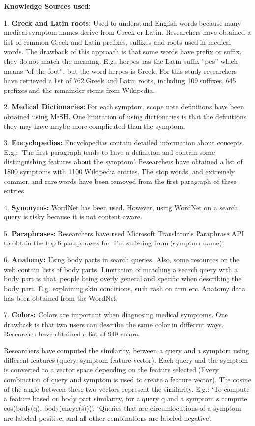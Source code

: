 \documentclass[]{article}
\begin{document}
\textbf{Knowledge Sources used:  }
 
1.\textbf{	Greek and Latin roots:} Used to understand English words because many medical symptom names derive from Greek or Latin. Researchers have obtained a list of common Greek and Latin prefixes, suffixes and roots used in medical words. The drawback of this approach is that some words have prefix or suffix, they do not match the meaning. E.g.: herpes has the Latin suffix “pes” which means “of the foot”, but the word herpes is Greek. For this study researchers have retrieved a list of 762 Greek and Latin roots, including 109 suffixes, 645 prefixes and the remainder stems from Wikipedia.
 
2.	\textbf{Medical Dictionaries:} For each symptom, scope note definitions have been obtained using MeSH. One limitation of using dictionaries is that the definitions they may have maybe more complicated than the symptom.

3.	\textbf{Encyclopedias:} Encyclopedias contain detailed information about concepts. E.g.: ‘The first paragraph tends to have a definition and contain some distinguishing features about the symptom’. Researchers have obtained a list of 1800 symptoms with 1100 Wikipedia entries. The stop words, and extremely common and rare words have been removed from the first paragraph of these entries

4.	\textbf{Synonyms:} WordNet has been used. However, using WordNet on a search query is risky because it is not content aware.

5.	\textbf{Paraphrases:} Researchers have used Microsoft Translator’s Paraphrase API to obtain the top 6 paraphrases for ‘I’m suffering from (symptom name)’.

6.	\textbf{Anatomy:} Using body parts in search queries. Also, some resources on the web contain 	lists of body parts. Limitation of matching a search query with a body part is that, people being overly general and specific when describing the body part. E.g. explaining skin conditions, such rash on arm etc. Anatomy data has been obtained from the WordNet. 

7.	\textbf{Colors:} Colors are important when diagnosing medical symptoms. One drawback is that two users can describe the same color in different ways. Researches have obtained a list of 949 colors. 

Researchers have computed the similarity, between a query and a symptom using different features (query, symptom feature vector). Each query and the symptom is converted to a vector space depending on the feature selected (Every combination of query and symptom is used to create a feature vector). The cosine of the angle between these two vectors represent the similarity. E.g.: ‘To compute a feature based on body part similarity, for a query q and a symptom s compute cos(body(q), body(encyc(s)))’. ‘Queries that are circumlocutions of a symptom are labeled positive, and all other combinations are labeled negative’. 
\end{document}

